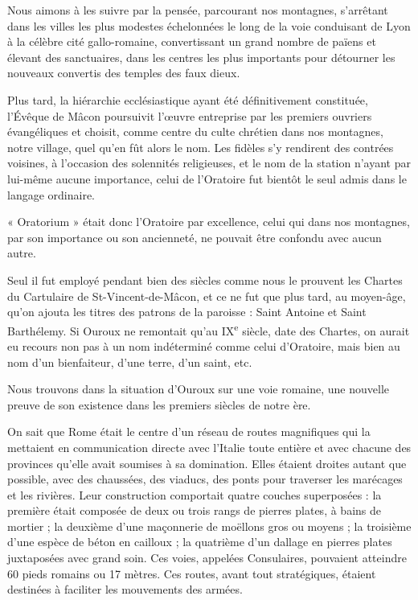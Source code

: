 \documentclass[11pt,a4paper]{report}
\begin{document}
Nous aimons à les suivre par la pensée, parcourant nos montagnes, s'arrêtant
dans les villes les plus modestes échelonnées le long de la voie conduisant de
Lyon à la célèbre cité gallo-romaine, convertissant un grand nombre de païens et
élevant des sanctuaires, dans les centres les plus importants pour détourner les
nouveaux convertis des temples des faux dieux.

Plus tard, la hiérarchie ecclésiastique ayant été définitivement constituée,
l'Évêque de Mâcon poursuivit l'œuvre entreprise par les premiers ouvriers
évangéliques et choisit, comme centre du culte chrétien dans nos montagnes,
notre village, quel qu'en fût alors le nom. Les fidèles s'y rendirent des
contrées voisines, à l'occasion des solennités religieuses, et le nom de la
station
n'ayant par lui-même aucune importance, celui de l'Oratoire fut bientôt le seul
admis dans le langage ordinaire.

« Oratorium » était donc l'Oratoire par excellence, celui qui dans nos
montagnes, par son importance ou son ancienneté, ne pouvait être confondu avec
aucun autre.

Seul il fut employé pendant bien des siècles comme nous le prouvent les Chartes
du Cartulaire de St-Vincent-de-Mâcon, et ce ne fut que plus tard, au moyen-âge,
qu'on ajouta les titres des patrons de la paroisse : Saint Antoine et Saint
Barthélemy. Si Ouroux ne remontait qu'au IX\textsuperscript{e} siècle, date des
Chartes, on aurait eu recours non pas à un nom indéterminé comme celui
d'Oratoire, mais bien au nom d'un bienfaiteur, d'une terre, d'un saint, etc.

Nous trouvons dans la situation d'Ouroux sur une voie romaine, une nouvelle
preuve de son existence dans les premiers siècles de notre ère.

On sait que Rome était le centre d'un réseau de routes magnifiques qui la
mettaient en communication directe avec l'Italie toute entière et avec chacune
des provinces qu'elle avait soumises à sa domination. Elles étaient droites
autant que possible, avec des chaussées, des viaducs, des ponts pour traverser
les marécages et les rivières. Leur construction comportait quatre couches
superposées : la première était composée de deux ou trois rangs de pierres
plates, à bains de mortier ; la deuxième d'une maçonnerie de moëllons gros ou
moyens ; la troisième d'une espèce de béton en cailloux ; la quatrième d'un
dallage en pierres plates juxtaposées avec grand soin. Ces voies, appelées
Consulaires, pouvaient atteindre 60 pieds romains ou 17 mètres. Ces routes,
avant tout stratégiques, étaient destinées à faciliter les mouvements des
armées.
\end{document}
